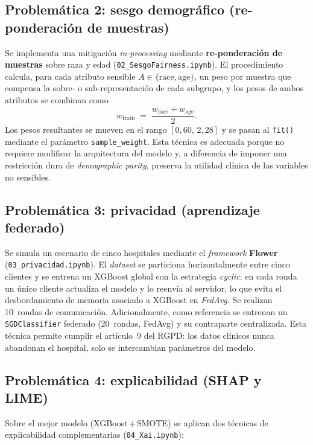 \documentclass[11pt,a4paper]{article}
\begin{document}
\subsection{Problemática 2: sesgo demográfico (re-ponderación de muestras)}

Se implementa una mitigación \textit{in-processing} mediante \textbf{re-ponderación de muestras} sobre raza y edad (\texttt{02\_SesgoFairness.ipynb}). El procedimiento calcula, para cada atributo sensible $A \in \{\text{race}, \text{age}\}$, un peso por muestra que compensa la sobre- o sub-representación de cada subgrupo, y los pesos de ambos atributos se combinan como
\begin{equation}
   w_{\text{train}} \;=\; \frac{w_{\text{race}} + w_{\text{age}}}{2}.
   \label{eq:reweight}
\end{equation}
Los pesos resultantes se mueven en el rango $[0{,}60,\, 2{,}28]$ y se pasan al \texttt{fit()} mediante el parámetro \texttt{sample\_weight}. Esta técnica es adecuada porque no requiere modificar la arquitectura del modelo y, a diferencia de imponer una restricción dura de \textit{demographic parity}, preserva la utilidad clínica de las variables no sensibles.

\subsection{Problemática 3: privacidad (aprendizaje federado)}

Se simula un escenario de cinco hospitales mediante el \textit{framework} \textbf{Flower}~\cite{ref_flower} (\texttt{03\_privacidad.ipynb}). El \textit{dataset} se particiona horizontalmente entre cinco clientes y se entrena un XGBoost global con la estrategia \textit{cyclic}: en cada ronda un único cliente actualiza el modelo y lo reenvía al servidor, lo que evita el desbordamiento de memoria asociado a XGBoost en \textit{FedAvg}. Se realizan 10~rondas de comunicación. Adicionalmente, como referencia se entrenan un \texttt{SGDClassifier} federado (20~rondas, FedAvg) y su contraparte centralizada. Esta técnica permite cumplir el artículo~9 del RGPD: los datos clínicos nunca abandonan el hospital, solo se intercambian parámetros del modelo.

\subsection{Problemática 4: explicabilidad (SHAP y LIME)}

Sobre el mejor modelo (XGBoost\,+\,SMOTE) se aplican dos técnicas de explicabilidad complementarias (\texttt{04\_Xai.ipynb}):
\end{document}
